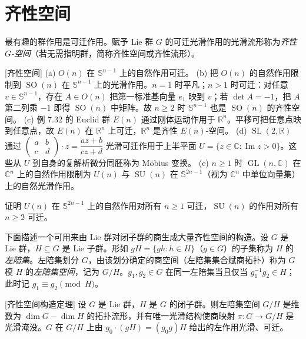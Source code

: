\documentclass[../../main.tex]{subfiles}
\begin{document}
\section{齐性空间}\label{section:ch21-homogeneous-spaces}

最有趣的群作用是可迁作用。赋予 Lie 群 $G$ 的可迁光滑作用的光滑流形称为\emph{齐性 $G$-空间}（若无需指明群，简称齐性空间或齐性流形）。

\begin{example}{[齐性空间]}\label{example:ch21-齐性空间}
(a) $O(n)$ 在 $\mathbb{S}^{n-1}$ 上的自然作用可迁。
(b) 把 $O(n)$ 的自然作用限制到 $\operatorname{SO}(n)$ 在 $\mathbb{S}^{n-1}$ 上的光滑作用。$n=1$ 时平凡；$n>1$ 时可迁：对任意 $v\in\mathbb{S}^{n-1}$，存在 $A\in O(n)$ 把第一标准基向量 $e_1$ 映到 $v$；若 $\det A=-1$，把 $A$ 第二列乘 $-1$ 即得 $\operatorname{SO}(n)$ 中矩阵。故 $n\geqslant2$ 时 $\mathbb{S}^{n-1}$ 也是 $\operatorname{SO}(n)$ 的齐性空间。
(c) 例 7.32 的 Euclid 群 $E(n)$ 通过刚体运动作用于 $\mathbb{R}^n$。平移可把任意点映到任意点，故 $E(n)$ 在 $\mathbb{R}^n$ 上可迁，$\mathbb{R}^n$ 是齐性 $E(n)$-空间。
(d) $\operatorname{SL}(2,\mathbb{R})$ 通过 $\begin{pmatrix}a&b\\ c&d\end{pmatrix}\cdot z=\dfrac{az+b}{cz+d}$ 光滑可迁作用于上半平面 $U=\{z\in\mathbb{C}\colon\operatorname{Im}z>0\}$。这些从 $U$ 到自身的复解析微分同胚称为 Möbius 变换。
(e) $n\geqslant1$ 时 $\operatorname{GL}(n,\mathbb{C})$ 在 $\mathbb{C}^n$ 上的自然作用限制为 $U(n)$ 与 $\operatorname{SU}(n)$ 在 $\mathbb{S}^{2n-1}$（视为 $\mathbb{C}^n$ 中单位向量集）上的自然光滑作用。
\end{example}

\begin{exercise}\label{exercise:ch21-Un与SUn可迁}
证明 $U(n)$ 在 $\mathbb{S}^{2n-1}$ 上的自然作用对所有 $n\geqslant1$ 可迁，$\operatorname{SU}(n)$ 的作用对所有 $n\geqslant2$ 可迁。
\end{exercise}

下面描述一个可用来由 Lie 群对闭子群的商生成大量齐性空间的构造。设 $G$ 是 Lie 群，$H\subseteq G$ 是 Lie 子群。形如 $gH=\{gh\colon h\in H\}$（$g\in G$）的子集称为 $H$ 的\emph{左陪集}。左陪集划分 $G$，由该划分确定的商空间（左陪集集合赋商拓扑）称为 $G$ 模 $H$ 的\emph{左陪集空间}，记为 $G/H$。$g_1,g_2\in G$ 在同一左陪集当且仅当 $g_1^{-1}g_2\in H$；此时记 $g_1\equiv g_2\pmod H$。

\begin{theorem}{[齐性空间构造定理]}\label{theorem:ch21-齐性空间构造}
设 $G$ 是 Lie 群，$H$ 是 $G$ 的闭子群。则左陪集空间 $G/H$ 是维数为 $\dim G-\dim H$ 的拓扑流形，并有唯一光滑结构使商映射 $\pi\colon G\to G/H$ 是光滑淹没。$G$ 在 $G/H$ 上由 $g_0\cdot(gH)=(g_0 g)H$ 给出的左作用光滑、可迁。
\end{theorem}
\end{document}
